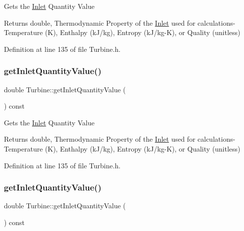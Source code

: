 Gets the \hyperlink{class_inlet}{Inlet} Quantity Value

\begin{DoxyReturn}{Returns}
double, Thermodynamic Property of the \hyperlink{class_inlet}{Inlet} used for calculations-\/ Temperature (K), Enthalpy (k\+J/kg), Entropy (k\+J/kg-\/K), or Quality (unitless) 
\end{DoxyReturn}


Definition at line 135 of file Turbine.\+h.

\mbox{\label{class_turbine_a3d8a3f317fa71abb3404144371615725}} 
\subsubsection{\texorpdfstring{get\+Inlet\+Quantity\+Value()}{getInletQuantityValue()}\hspace{0.1cm}{\footnotesize\ttfamily [2/3]}}
{\footnotesize\ttfamily double Turbine\+::get\+Inlet\+Quantity\+Value (\begin{DoxyParamCaption}{ }\end{DoxyParamCaption}) const\hspace{0.3cm}{\ttfamily [inline]}}

Gets the \hyperlink{class_inlet}{Inlet} Quantity Value

\begin{DoxyReturn}{Returns}
double, Thermodynamic Property of the \hyperlink{class_inlet}{Inlet} used for calculations-\/ Temperature (K), Enthalpy (k\+J/kg), Entropy (k\+J/kg-\/K), or Quality (unitless) 
\end{DoxyReturn}


Definition at line 135 of file Turbine.\+h.

\mbox{\label{class_turbine_a3d8a3f317fa71abb3404144371615725}} 
\subsubsection{\texorpdfstring{get\+Inlet\+Quantity\+Value()}{getInletQuantityValue()}\hspace{0.1cm}{\footnotesize\ttfamily [3/3]}}
{\footnotesize\ttfamily double Turbine\+::get\+Inlet\+Quantity\+Value (\begin{DoxyParamCaption}{ }\end{DoxyParamCaption}) const\hspace{0.3cm}{\ttfamily [inline]}}

